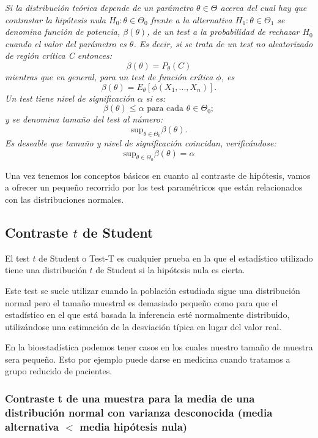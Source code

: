 \documentclass[a4paper,12pt]{article}
\begin{document}
\textit{
    Si la distribución teórica depende de un parámetro $\theta \in \Theta$ acerca del cual hay que contrastar la hipótesis nula $H_0: \theta \in \Theta_0$ frente a la alternativa $H_1: \theta \in \Theta_1$ se denomina función de potencia, $\beta(\theta)$, de un test a la probabilidad de rechazar $H_0$ cuando el valor del parámetro es $\theta$. Es decir, si se trata de un test no aleatorizado de región crítica C entonces: $$\beta(\theta)=P_\theta(C)$$
mientras que en general, para un test de función crítica $\phi$, es $$\beta(\theta)=E_\theta[\phi(X_1,...,X_n)].$$
Un test tiene nivel de significación $\alpha$ si es:  $$\beta(\theta)\leq\alpha \text{ para cada } \theta \in \Theta_0;$$
y se denomina tamaño del test al número: 
\begin{equation}
    \mathrm{sup}_{\theta\in\Theta_0}\beta(\theta)
    .
\end{equation}
Es deseable que tamaño y nivel de significación coincidan, verificándose: 
$$\mathrm{sup}_{\theta\in\Theta_0}\beta(\theta)=\alpha$$ }

Una vez tenemos los conceptos básicos en cuanto al contraste de hipótesis, vamos a ofrecer un pequeño recorrido por los test paramétricos que están relacionados con las distribuciones normales.


 \subsection{Contraste $t$ de Student}
 El test $t$ de Student o Test-T es cualquier prueba en la que el estadístico utilizado tiene una distribución $t$ de Student si la hipótesis nula es cierta.
 
 Este test se suele utilizar cuando la población estudiada sigue una distribución normal pero el tamaño muestral es demasiado pequeño como para que el estadístico en el que está basada la inferencia esté normalmente distribuido, utilizándose una estimación de la desviación típica en lugar del valor real. 
 
 En la bioestadística podemos tener casos en los cuales nuestro tamaño de muestra sera pequeño. Esto por ejemplo puede darse en medicina cuando tratamos a grupo reducido de pacientes.

 \subsubsection{Contraste t de una muestra para la media de una distribución normal con varianza desconocida (media alternativa $<$ media hipótesis nula)}
 
\end{document}
